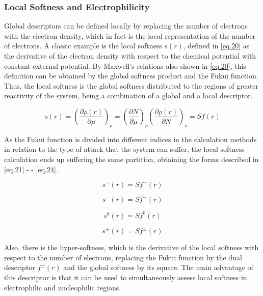 \documentclass[a4paper,11pt]{refart}
\begin{document}
	\subsubsection{Local Softness and Electrophilicity}

	Global descriptors can be defined locally by replacing the number of electrons with the electron density, which in fact is the local representation of the number of electrons. A classic example is the local softness $s(r)$, defined in \autoref{eq.20} as the derivative of the electron density with respect to the chemical potential with constant external potential. By Maxwell's relations also shown in \autoref{eq.20}, this definition can be obtained by the global softness product and the Fukui function. Thus, the local softness is the global softness distributed to the regions of greater reactivity of the system, being a combination of a global and a local descriptor\cite{Lee1988}.

	\begin{equation}
	s(r)= \left(\frac{\partial \rho(r)}{\partial \mu} \right)_\nu =
	\left(\frac{\partial N}{\partial \mu}\right)_\nu
	\left(\frac{\partial \rho(r)}{\partial N} \right)_\nu = Sf(r)
	\label{eq.20}
	\end{equation}

	As the Fukui function is divided into different indices in the calculation methods in relation to the type of attack that the system can suffer, the local softness calculation ends up suffering the same partition, obtaining the forms described in \autoref{eq.21} - - \autoref{eq.24}.

	\begin{equation}
	s^-(r) = Sf^-(r)
	\label{eq.21}
	\end{equation}

	\begin{equation}
	s^-(r) = Sf^-(r)
	\label{eq.22}
	\end{equation}

	\begin{equation}
	s^{0}(r) = Sf^{0}(r)
	\label{eq.23}
	\end{equation}

	\begin{equation}
	s^{\pm}(r) = Sf^{\pm}(r)
	\label{eq.24}
	\end{equation}

	Also, there is the hyper-softness, which is the derivative of the local softness with respect to the number of electrons, replacing the Fukui function by the dual descriptor $f^{\pm}(r)$ and the global softness by its square\cite {sandoval2018theoretical}. The main advantage of this descriptor is that it can be used to simultaneously assess local softness in electrophilic and nucleophilic regions.
\end{document}
